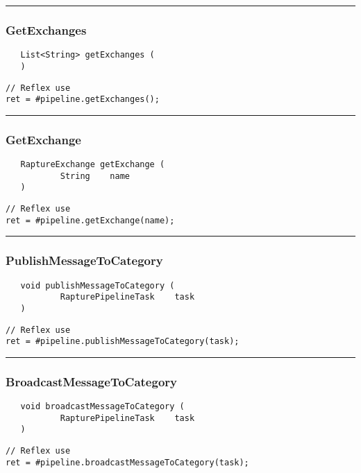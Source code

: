 \rule{15cm}{2pt}
\subsubsection{GetExchanges}
\label{Api:GetExchanges}
\begin{verbatim}
   List<String> getExchanges (
   )
\end{verbatim}
\begin{lstlisting}[language=reflex]
// Reflex use
ret = #pipeline.getExchanges();
\end{lstlisting}



\rule{15cm}{2pt}
\subsubsection{GetExchange}
\label{Api:GetExchange}
\begin{verbatim}
   RaptureExchange getExchange (
           String    name
   )
\end{verbatim}
\begin{lstlisting}[language=reflex]
// Reflex use
ret = #pipeline.getExchange(name);
\end{lstlisting}



\rule{15cm}{2pt}
\subsubsection{PublishMessageToCategory}
\label{Api:PublishMessageToCategory}
\begin{verbatim}
   void publishMessageToCategory (
           RapturePipelineTask    task
   )
\end{verbatim}
\begin{lstlisting}[language=reflex]
// Reflex use
ret = #pipeline.publishMessageToCategory(task);
\end{lstlisting}



\rule{15cm}{2pt}
\subsubsection{BroadcastMessageToCategory}
\label{Api:BroadcastMessageToCategory}
\begin{verbatim}
   void broadcastMessageToCategory (
           RapturePipelineTask    task
   )
\end{verbatim}
\begin{lstlisting}[language=reflex]
// Reflex use
ret = #pipeline.broadcastMessageToCategory(task);
\end{lstlisting}



